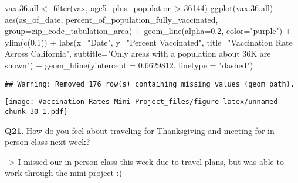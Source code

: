 \documentclass[
]{article}
\newenvironment{Shaded}{\begin{snugshade}}{\end{snugshade}}
\newcommand{\AttributeTok}[1]{\textcolor[rgb]{0.77,0.63,0.00}{#1}}
\newcommand{\DecValTok}[1]{\textcolor[rgb]{0.00,0.00,0.81}{#1}}
\newcommand{\FloatTok}[1]{\textcolor[rgb]{0.00,0.00,0.81}{#1}}
\newcommand{\FunctionTok}[1]{\textcolor[rgb]{0.00,0.00,0.00}{#1}}
\newcommand{\NormalTok}[1]{#1}
\newcommand{\OtherTok}[1]{\textcolor[rgb]{0.56,0.35,0.01}{#1}}
\newcommand{\SpecialCharTok}[1]{\textcolor[rgb]{0.00,0.00,0.00}{#1}}
\newcommand{\StringTok}[1]{\textcolor[rgb]{0.31,0.60,0.02}{#1}}
\begin{document}
\begin{Shaded}
\begin{Highlighting}[]
\NormalTok{vax.}\FloatTok{36.}\NormalTok{all }\OtherTok{\textless{}{-}} \FunctionTok{filter}\NormalTok{(vax, age5\_plus\_population }\SpecialCharTok{\textgreater{}} \DecValTok{36144}\NormalTok{)}
\FunctionTok{ggplot}\NormalTok{(vax.}\FloatTok{36.}\NormalTok{all) }\SpecialCharTok{+}
  \FunctionTok{aes}\NormalTok{(as\_of\_date,}
\NormalTok{      percent\_of\_population\_fully\_vaccinated, }
      \AttributeTok{group=}\NormalTok{zip\_code\_tabulation\_area) }\SpecialCharTok{+}
  \FunctionTok{geom\_line}\NormalTok{(}\AttributeTok{alpha=}\FloatTok{0.2}\NormalTok{, }\AttributeTok{color=}\StringTok{"purple"}\NormalTok{) }\SpecialCharTok{+}
  \FunctionTok{ylim}\NormalTok{(}\FunctionTok{c}\NormalTok{(}\DecValTok{0}\NormalTok{,}\DecValTok{1}\NormalTok{)) }\SpecialCharTok{+}
  \FunctionTok{labs}\NormalTok{(}\AttributeTok{x=}\StringTok{"Date"}\NormalTok{, }\AttributeTok{y=}\StringTok{"Percent Vaccinated"}\NormalTok{,}
       \AttributeTok{title=}\StringTok{"Vaccination Rate Across California"}\NormalTok{,}
       \AttributeTok{subtitle=}\StringTok{"Only areas with a population about 36K are shown"}\NormalTok{) }\SpecialCharTok{+}
  \FunctionTok{geom\_hline}\NormalTok{(}\AttributeTok{yintercept =} \FloatTok{0.6629812}\NormalTok{, }\AttributeTok{linetype =} \StringTok{"dashed"}\NormalTok{)}
\end{Highlighting}
\end{Shaded}

\begin{verbatim}
## Warning: Removed 176 row(s) containing missing values (geom_path).
\end{verbatim}

\texttt{[image: Vaccination-Rates-Mini-Project\_files/figure-latex/unnamed-chunk-30-1.pdf]}

\textbf{Q21}. How do you feel about traveling for Thanksgiving and
meeting for in-person class next week?

--\textgreater{} I missed our in-person class this week due to travel
plans, but was able to work through the mini-project :)
\end{document}
